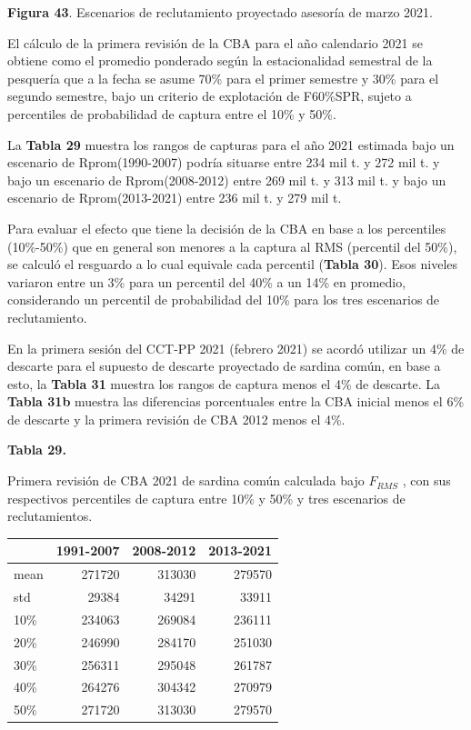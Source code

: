 \documentclass[
  spanish,
]{article}
\begin{document}
\small

\textbf{Figura 43}. Escenarios de reclutamiento proyectado asesoría de
marzo 2021. \vspace{0.5cm} \normalsize

El cálculo de la primera revisión de la CBA para el año calendario 2021
se obtiene como el promedio ponderado según la estacionalidad semestral
de la pesquería que a la fecha se asume 70\% para el primer semestre y
30\% para el segundo semestre, bajo un criterio de explotación de
F60\%SPR, sujeto a percentiles de probabilidad de captura entre el 10\%
y 50\%.

La \textbf{Tabla 29} muestra los rangos de capturas para el año 2021
estimada bajo un escenario de Rprom(1990-2007) podría situarse entre 234
mil t. y 272 mil t. y bajo un escenario de Rprom(2008-2012) entre 269
mil t. y 313 mil t. y bajo un escenario de Rprom(2013-2021) entre 236
mil t. y 279 mil t.

Para evaluar el efecto que tiene la decisión de la CBA en base a los
percentiles (10\%-50\%) que en general son menores a la captura al RMS
(percentil del 50\%), se calculó el resguardo a lo cual equivale cada
percentil (\textbf{Tabla 30}). Esos niveles variaron entre un 3\% para
un percentil del 40\% a un 14\% en promedio, considerando un percentil
de probabilidad del 10\% para los tres escenarios de reclutamiento.

En la primera sesión del CCT-PP 2021 (febrero 2021) se acordó utilizar
un 4\% de descarte para el supuesto de descarte proyectado de sardina
común, en base a esto, la \textbf{Tabla 31} muestra los rangos de
captura menos el 4\% de descarte. La \textbf{Tabla 31b} muestra las
diferencias porcentuales entre la CBA inicial menos el 6\% de descarte y
la primera revisión de CBA 2012 menos el 4\%.

\vspace{0.5cm}

\pagebreak

\small
\begin{center} 
\textbf{Tabla 29.}
\end{center}
\begin{center} 
\vspace{-0.2cm} Primera revisión de CBA 2021 de sardina común calculada bajo $F_{RMS}$ , con sus respectivos percentiles de captura entre 10\% y 50\% y tres escenarios de reclutamientos.
\end{center}
\vspace{-0.2cm}

\begin{longtable}[]{@{}lrrr@{}}
\toprule
& 1991-2007 & 2008-2012 & 2013-2021\tabularnewline
\midrule
\endhead
mean & 271720 & 313030 & 279570\tabularnewline
std & 29384 & 34291 & 33911\tabularnewline
10\% & 234063 & 269084 & 236111\tabularnewline
20\% & 246990 & 284170 & 251030\tabularnewline
30\% & 256311 & 295048 & 261787\tabularnewline
40\% & 264276 & 304342 & 270979\tabularnewline
50\% & 271720 & 313030 & 279570\tabularnewline
\bottomrule
\end{longtable}
\end{document}
